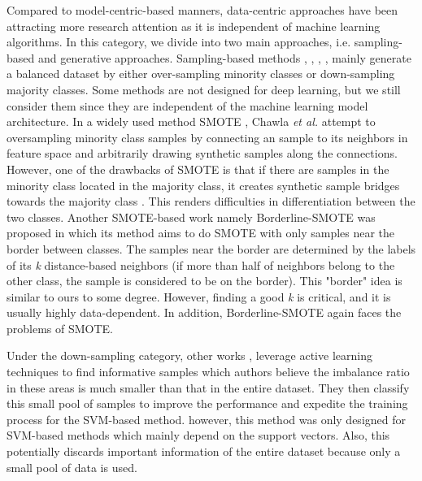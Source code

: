 Compared to model-centric-based manners, data-centric approaches have been attracting more research attention as it is independent of machine learning algorithms. In this category, we divide into two main approaches, i.e. sampling-based and generative approaches. Sampling-based methods \cite{DBLP:journals/corr/ShenLH15}, \cite{DBLP:journals/corr/abs-1711-00941}, \cite{haibo_he_learning_2009}, \cite{li_entropy-based_2020}, \cite{ertekin_active_2007} mainly generate a balanced dataset by either over-sampling minority classes or down-sampling majority classes. Some methods are not designed for deep learning, but we still consider them since they are independent of the machine learning model architecture. In a widely used method SMOTE \cite{chawla_smote:_2002}, Chawla \textit{et al.} attempt to oversampling minority class samples by connecting an sample to its neighbors in feature space and arbitrarily drawing synthetic samples along the connections. However, one of the drawbacks of SMOTE is that if there are samples in the minority class located in the majority class, it creates synthetic sample bridges towards the majority class \cite{goswami_class_2020}. This renders difficulties in differentiation between the two classes. Another SMOTE-based work namely Borderline-SMOTE \cite{bordersmote} was proposed in which its method aims to do SMOTE with only samples near the border between classes. The samples near the border are determined by the labels of its \textit{k} distance-based neighbors (if more than half of neighbors belong to the other class, the sample is considered to be on the border). This "border" idea is similar to ours to some degree. However, finding a good \textit{k} is critical, and it is usually highly data-dependent. In addition, Borderline-SMOTE again faces the problems of SMOTE. 


Under the down-sampling category, other works \cite{ertekin_learning_2007}, \cite{aggarwal_active_2020} leverage active learning techniques to find informative samples which authors believe the imbalance ratio in these areas is much smaller than that in the entire dataset. They then classify this small pool of samples to improve the performance and expedite the training process for the SVM-based method. however, this method was only designed for SVM-based methods which mainly depend on the support vectors. Also, this potentially discards important information of the entire dataset because only a small pool of data is used.  

